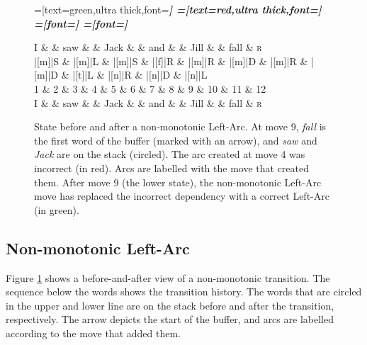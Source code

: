 \documentclass[11pt,letterpaper]{article}
\begin{document}
\begin{figure}
    \centering
    \begin{dependency}[theme=simple]
        =[text=green,ultra thick,font=\bfseries\itshape]
        =[text=red,ultra thick,font=\bfseries\itshape]
        =[font=\bfseries\itshape]
        =[font=\itshape]

        \begin{deptext}[column sep=.075cm, row sep=.1ex]
            I \&           \& saw \&          \& Jack       \& \& and     \&           \& Jill   \&  \& fall \& \textsc{r} \\
|[m]|S \& |[m]|L \& |[m]|S   \& |[f]|R \& |[m]|R \& |[m]|D \& |[m]|R \& |[m]|D \& |[t]|L \& |[n]|R \& |[n]|D \& |[n]|L \\
            1 \&     2       \& 3  \&   4      \& 5          \& 6 \& 7     \& 8 \& 9 \& 10 \& 11 \& 12 \\
    I \&           \& saw \&          \& Jack       \& \& and     \&           \& Jill   \&      \& fall \& \textsc{r} \\
        \end{deptext}
    
    
\end{dependency}
\caption{
    State before and after a non-monotonic Left-Arc.
    At move 9, \emph{fall} is the first word of the buffer (marked with an arrow),
    and \emph{saw} and \emph{Jack} are on the stack (circled). The arc created at move 4 was
    incorrect (in red). Arcs are labelled with the move that created them.
    After move 9 (the lower state), the non-monotonic Left-Arc move
    has replaced the incorrect dependency with a correct Left-Arc (in green).
\label{fig:clobber}}
\end{figure}


\subsection{Non-monotonic Left-Arc}

Figure \ref{fig:clobber} shows a before-and-after view of a non-monotonic
transition. The sequence below the words shows the transition history.
The words that are circled in the upper and lower line are on the stack before
and after the transition, respectively. The arrow depicts the start of the buffer,
and arcs are labelled according to the move that added them. 
\end{document}
